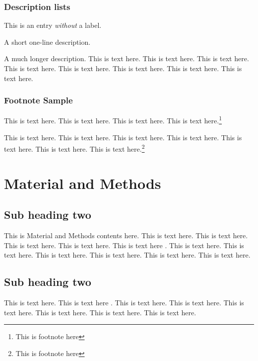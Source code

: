 \documentclass[a4paper,10pt]{edpsci} %
\begin{document}
\subsubsection{Description lists}

\begin{description}
   \item This is an entry \textit{without} a label.
   \item[Something short] A short one-line description.
   \item[Something long] A much longer description.
This is text here. This is text here. This is text here. This is text here. This is text here. This is text here. This is text here. This is text here.
\end{description}

\subsubsection{Footnote Sample}

This is text here. This is text here. This is text here. This is text here.\footnote{This is footnote here}

This is text here. This is text here. This is text here. This is text here.
This is text here. This is text here. This is text here.\footnote{This is footnote here}




\section{Material and Methods}

\subsection{Sub heading two}

This is Material and Methods contents here.
This is text here.  This is text here. This is text here. This is text here. This is text here \cite{Ref3}. This is text here. This is text here. This is text here. This is text here. This is text here. This is text here.

\subsection{Sub heading two}

This is text here. This is text here \cite{Ref4}. This is text here. This is text here. This is text here. This is text here. This is text here. This is text here. 
\end{document}
